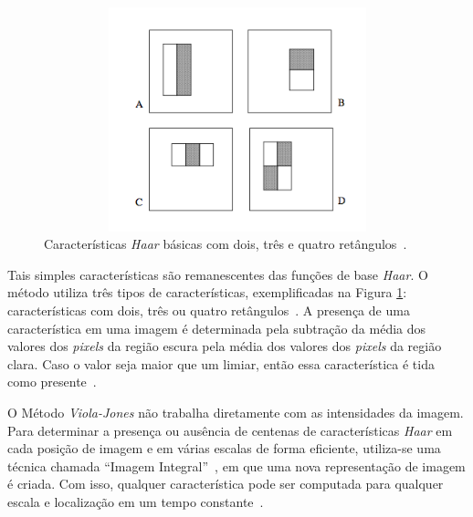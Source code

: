 \begin{figure}[hbt]
		\begin{center}
			\includegraphics[height=6.5cm,width=12.5cm]{figuras/2.FundamentacaoTeorica/haarfeaturestypes.png}
		\end{center}
		\caption{Características \textit{Haar} básicas com dois, três e quatro retângulos~\cite{violajones}.}
		\label{haarfeaturestypes}
\end{figure}

Tais simples características são remanescentes das funções de base \textit{Haar}. O método utiliza três tipos de características, exemplificadas na Figura \ref{haarfeaturestypes}: características com dois, três ou quatro retângulos~\cite{violajones}. A presença de uma característica em uma imagem é determinada pela subtração da média dos valores dos \textit{pixels} da região escura pela média dos valores dos \textit{pixels} da região clara. Caso o valor seja maior que um limiar, então essa característica é tida como presente~\cite{servodetection}.

O Método \textit{Viola-Jones} não trabalha diretamente com as intensidades da imagem. Para determinar a presença ou ausência de centenas de características \textit{Haar} em cada posição de imagem e em várias escalas de forma eficiente, utiliza-se uma técnica chamada ``Imagem Integral''~\cite{servodetection, violajones}, em que uma nova representação de imagem é criada. Com isso, qualquer característica pode ser computada para qualquer escala e localização em um tempo constante~\cite{violajones}.


